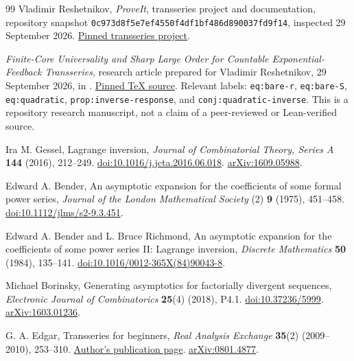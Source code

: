 \documentclass[11pt,a4paper]{article}
\numberwithin{equation}{section}
\theoremstyle{definition}
\theoremstyle{remark}
\begin{document}
\begin{thebibliography}{99}
Vladimir Reshetnikov, \emph{ProveIt}, transseries project and documentation,
repository snapshot
\texttt{0c973d8f5e7ef4550f4df1bf486d890037fd9f14}, inspected
29 September 2026.
\href{https://github.com/VladimirReshetnikov/ProveIt/tree/0c973d8f5e7ef4550f4df1bf486d890037fd9f14/Analysis/Transseries}{Pinned transseries project}.

\emph{Finite-Core Universality and Sharp Large Order for Countable
Exponential-Feedback Transseries}, research article prepared for Vladimir
Reshetnikov, 29 September 2026, in \cite{repo}.
\href{https://github.com/VladimirReshetnikov/ProveIt/blob/0c973d8f5e7ef4550f4df1bf486d890037fd9f14/Analysis/Transseries/docs/series-and-transseries/Finite_Core_Universality_Exponential_Feedback/article.tex}{Pinned TeX source}.
Relevant labels: \texttt{eq:bare-r}, \texttt{eq:bare-S},
\texttt{eq:quadratic}, \texttt{prop:inverse-response}, and
\texttt{conj:quadratic-inverse}. This is a repository research manuscript,
not a claim of a peer-reviewed or Lean-verified source.

Ira M. Gessel, Lagrange inversion, \emph{Journal of Combinatorial Theory,
Series A} \textbf{144} (2016), 212--249.
\href{https://doi.org/10.1016/j.jcta.2016.06.018}{doi:10.1016/j.jcta.2016.06.018}.
\href{https://arxiv.org/abs/1609.05988}{arXiv:1609.05988}.

Edward A. Bender, An asymptotic expansion for the coefficients of some
formal power series, \emph{Journal of the London Mathematical Society}
(2) \textbf{9} (1975), 451--458.
\href{https://doi.org/10.1112/jlms/s2-9.3.451}{doi:10.1112/jlms/s2-9.3.451}.

Edward A. Bender and L. Bruce Richmond, An asymptotic expansion for the
coefficients of some power series II: Lagrange inversion,
\emph{Discrete Mathematics} \textbf{50} (1984), 135--141.
\href{https://doi.org/10.1016/0012-365X(84)90043-8}{doi:10.1016/0012-365X(84)90043-8}.

Michael Borinsky, Generating asymptotics for factorially divergent sequences,
\emph{Electronic Journal of Combinatorics} \textbf{25}(4) (2018), P4.1.
\href{https://doi.org/10.37236/5999}{doi:10.37236/5999}.
\href{https://arxiv.org/abs/1603.01236}{arXiv:1603.01236}.

G. A. Edgar, Transseries for beginners,
\emph{Real Analysis Exchange} \textbf{35}(2) (2009--2010), 253--310.
\href{https://people.math.osu.edu/edgar/preprints/trans_begin/}{Author's publication page}.
\href{https://arxiv.org/abs/0801.4877}{arXiv:0801.4877}.


\end{thebibliography}
\end{document}
